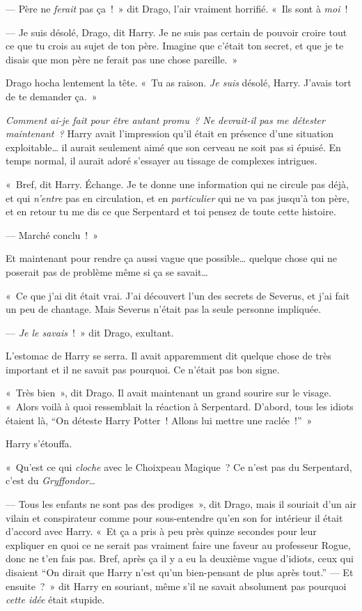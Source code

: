 --- Père ne \emph{ferait} pas ça~!~»
dit Drago, l'air vraiment horrifié.
«~Ils sont à \emph{moi}~!

--- Je suis désolé, Drago, dit Harry.
Je ne suis pas certain de pouvoir croire tout ce que tu crois au sujet de ton père.
Imagine que c'était ton secret, et que je te disais que mon père ne ferait pas une chose pareille.~»

Drago hocha lentement la tête.
«~Tu as raison.
\emph{Je suis} désolé, Harry.
J'avais tort de te demander ça.~»

\emph{Comment ai-je fait pour être autant promu~?
Ne devrait-il pas me détester maintenant~?} Harry avait l'impression qu'il était en présence d'une situation exploitable… il aurait seulement aimé que son cerveau ne soit pas si épuisé.
En temps normal, il aurait adoré s'essayer au tissage de complexes intrigues.

«~Bref, dit Harry.
Échange.
Je te donne une information qui ne circule pas déjà, et qui \emph{n'entre} pas en circulation, et en \emph{particulier} qui ne va pas jusqu'à ton père, et en retour tu me dis ce que Serpentard et toi pensez de toute cette histoire.

--- Marché conclu~!~»

Et maintenant pour rendre ça aussi vague que possible… quelque chose qui ne poserait pas de problème même si ça se savait…

«~Ce que j'ai dit était vrai.
J'ai découvert l'un des secrets de Severus, et j'ai fait un peu de chantage.
Mais Severus n'était pas la seule personne impliquée.

--- \emph{Je le savais}~!~»
dit Drago, exultant.

L'estomac de Harry se serra.
Il avait apparemment dit quelque chose de très important et il ne savait pas pourquoi.
Ce n'était pas bon signe.

«~Très bien~», dit Drago.
Il avait maintenant un grand sourire sur le visage.
«~Alors voilà à quoi ressemblait la réaction à Serpentard.
D'abord, tous les idiots étaient là, “On déteste Harry Potter~!
Allons lui mettre une raclée~!”~»

Harry s'étouffa.

«~Qu'est ce qui \emph{cloche} avec le Choixpeau Magique~?
Ce n'est pas du Serpentard, c'est du \emph{Gryffondor}…

--- Tous les enfants ne sont pas des prodiges~», dit Drago, mais il souriait d'un air vilain et conspirateur comme pour sous-entendre qu'en son for intérieur il était d'accord avec Harry.
«~Et ça a pris à peu près quinze secondes pour leur expliquer en quoi ce ne serait pas vraiment faire une faveur au professeur Rogue, donc ne t'en fais pas.
Bref, après ça il y a eu la deuxième vague d'idiots, ceux qui disaient “On dirait que Harry n'est qu'un bien-pensant de plus après tout.”
--- Et ensuite~?~»
dit Harry en souriant, même s'il ne savait absolument pas pourquoi \emph{cette idée} était stupide.

